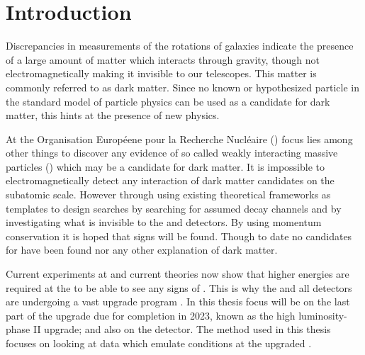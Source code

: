 \chapter{Introduction}\label{cha:intro}
Discrepancies in measurements of the rotations of galaxies indicate the presence of a large amount of matter which interacts through gravity, though not electromagnetically making it invisible to our telescopes. This matter is commonly referred to as dark matter. Since no known or hypothesized particle in the standard model of particle physics can be used as a candidate for dark matter, this hints at the presence of new physics. 

At the Organisation Européene pour la Recherche Nucléaire (\abbrCERN) focus lies among other things to discover any evidence of so called weakly interacting massive particles (\abbrWIMPS) which may be a candidate for dark matter. It is impossible to electromagnetically detect any interaction of dark matter candidates on the subatomic scale. However through using existing theoretical frameworks as templates to design searches by searching for assumed decay channels and by investigating what is invisible to the \abbrATLAS and \abbrCMS detectors. By using momentum conservation it is hoped that signs will be found. Though to date no candidates for \abbrWIMPS have been found nor any other explanation of dark matter. 

Current experiments at \abbrCERN and current theories now show that higher energies are required at the \abbrLHC to be able to see any signs of \abbrWIMPS . This is why the \abbrLHC and all detectors are undergoing a vast upgrade program \citep{ATLAS:LOI2}.
In this thesis focus will be on the last part of the upgrade due for completion in 2023, known as the high luminosity-\abbrLHC phase II upgrade; and also on the \abbrATLAS detector. The method used in this thesis focuses on looking at data which emulate conditions at the upgraded \abbrLHC .

\newpage
